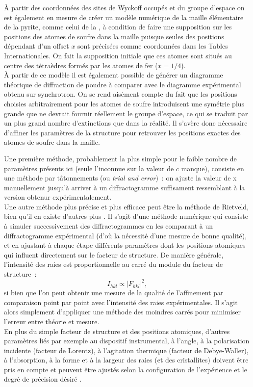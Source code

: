 À partir des coordonnées des sites de Wyckoff occupés et du groupe d'espace on est également en mesure de créer un modèle numérique de la maille élémentaire de la pyrite, comme celui de la , à condition de faire une supposition sur les positions des atomes de soufre dans la maille puisque seules des positions dépendant d'un offset \(x\) sont précisées comme coordonnées dans les Tables Internationales.
On fait la supposition initiale que ces atomes sont situés au centre des tétraèdres formés par les atomes de fer (\(x = 1/4\)).\\
À partir de ce modèle il est également possible de générer un diagramme théorique de diffraction de poudre à comparer avec le diagramme expérimental obtenu sur synchrotron.
On se rend aisément compte du fait que les positions choisies arbitrairement pour les atomes de soufre introduisent une symétrie plus grande que ne devrait fournir réellement le groupe d'espace, ce qui se traduit par un plus grand nombre d'extinctions que dans la réalité.
Il s'avère donc nécessaire d'affiner les paramètres de la structure pour retrouver les positions exactes des atomes de soufre dans la maille.

Une première méthode, probablement la plus simple pour le faible nombre de paramètres présents ici (seule l'inconnue sur la valeur de \(c\) manque), consiste en une méthode par tâtonnements (ou \textit{trial and error})~: on ajuste la valeur de x manuellement jusqu'à arriver à un diffractogramme suffisament ressemblant à la version obtenur expérimentalement.\\
Une autre méthode plus précise et plus efficace peut être la méthode de Rietveld, bien qu'il en existe d'autres plus . Il s'agit d'une méthode numérique qui consiste à simuler successivement des diffractogrammes en les comparant à un diffractogramme expérimental (d'où la nécessité d'une mesure de bonne qualité), et en ajustant à chaque étape différents paramètres dont les positions atomiques qui influent directement sur le facteur de structure.
De manière générale, l'intensité des raies est proportionnelle au carré du module du facteur de structure~:
\begin{equation}
I_{hkl} \propto \left| F_{hkl} \right|^2,
\end{equation}
si bien que l'on peut obtenir une mesure de la qualité de l'affinement par comparaison point par point avec l'intensité des raies expérimentales.
Il s'agit alors simplement d'appliquer une méthode des moindres carrés pour minimiser l'erreur entre théorie et mesure.\\
En plus du simple facteur de structure et des positions atomiques, d'autres paramètres liés par exemple au dispositif instrumental, à l'angle, à la polarisation incidente (facteur de Lorentz), à l'agitation thermique (facteur de Debye-Waller), à l'absorption, à la forme et à la largeur des raies (et des cristallites) doivent être pris en compte et peuvent être ajustés selon la configuration de l'expérience et le degré de précision désiré \cite{AlbinatiIUCr2006}.

